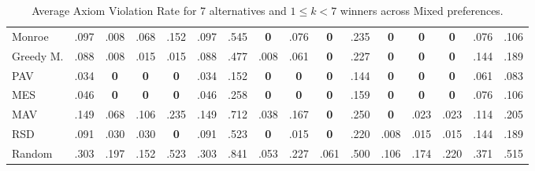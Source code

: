\begin{table}[tbp]
\begin{tabular}{lccccccccccccccc}
Monroe & .097 & .008 & .068 & .152 & .097 & .545 & \textbf{0} & .076 & \cellcolor{green!25}\textbf{0} & .235 & \cellcolor{green!25}\textbf{0} & \textbf{0} & \textbf{0} & .076 & .106 \\
Greedy M. & .088 & .008 & .015 & .015 & .088 & .477 & .008 & .061 & \cellcolor{green!25}\textbf{0} & .227 & \cellcolor{green!25}\textbf{0} & \textbf{0} & \textbf{0} & .144 & .189 \\
PAV & .034 & \textbf{0} & \textbf{0} & \cellcolor{green!25}\textbf{0} & .034 & .152 & \textbf{0} & \textbf{0} & \textbf{0} & .144 & \cellcolor{green!25}\textbf{0} & \cellcolor{green!25}\textbf{0} & \textbf{0} & .061 & .083 \\
MES & .046 & \textbf{0} & \textbf{0} & \textbf{0} & .046 & .258 & \textbf{0} & \textbf{0} & \textbf{0} & .159 & \cellcolor{green!25}\textbf{0} & \cellcolor{green!25}\textbf{0} & \textbf{0} & .076 & .106 \\
MAV & .149 & .068 & .106 & .235 & .149 & .712 & .038 & .167 & \textbf{0} & .250 & \textbf{0} & .023 & .023 & .114 & .205 \\
RSD & .091 & .030 & .030 & \textbf{0} & .091 & .523 & \textbf{0} & .015 & \textbf{0} & .220 & .008 & .015 & .015 & .144 & .189 \\
Random & .303 & .197 & .152 & .523 & .303 & .841 & .053 & .227 & .061 & .500 & .106 & .174 & .220 & .371 & .515 \\
\bottomrule
\end{tabular}
\caption{Average Axiom Violation Rate for 7 alternatives and $1 \leq k < 7$ winners across Mixed preferences.}
\end{table}
